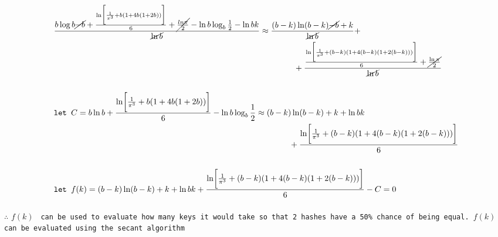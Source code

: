 \documentclass[fleqn, a4paper,12pt]{article}
\begin{document}
\thispagestyle{empty} %
\[
\begin{aligned}
		& \frac{b\log b \cancel{-b} + \frac{\ln\biggl[\frac{1}{\pi^3} +  b(1+4b(1+2b)) \biggr]}{6} + \cancel{\frac{ln\pi}{2}} - \ln b \log_b\frac{1}{2} - \ln b k}{\cancel{\ln b}} \approx \frac{(b-k)\ln(b-k) \cancel{-b} + k }{\cancel{\ln b}} +  \\ 
& \hspace{10.3cm} + \frac{\frac{\ln \biggl[\frac{1}{\pi^3} + (b-k)(1+4(b-k)(1+2(b-k)))\biggr]}{6} + \cancel{\frac{\ln\pi}{2}}}{\cancel{\ln b}} \\
& \\
& \texttt{let } C = b\ln b + \frac{\ln \biggl[\frac{1}{\pi^3} + b(1+4b(1+2b)) \biggr]}{6} - \ln b \log_b\frac{1}{2} \approx (b-k)\ln(b-k) + k + \ln b k  \\ 
& \hspace{10.1cm} + \frac{\ln \biggl[\frac{1}{\pi^3} + (b-k)(1+4(b-k)(1+2(b-k)))\biggr]}{6} \\
& \\
& \texttt{let } f(k) = (b-k)\ln(b-k) + k + \ln b k + \frac{\ln \biggl[\frac{1}{\pi^3} + (b-k)(1+4(b-k)(1+2(b-k)))\biggr]}{6} - C = 0\\
\end{aligned}
\]

\[
\begin{aligned}
\end{aligned}
\]
$\therefore$ $f(k)$ \texttt{ can be used to evaluate how many keys it would take so that 2 hashes have a 50\% chance of being equal. $f(k)$ can be evaluated using the secant algorithm}
\end{document}
